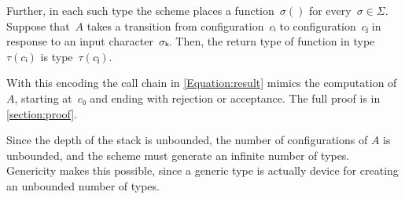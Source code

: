 \documentclass[a4paper,USenglish]{lipics-v2016}
\newcommand\cc[1]{\textcolor{Sepia}{\text{\textup{\textbf{\texttt{#1}}}}}}
\numberwithin{equation}{section}
\numberwithin{figure}{section}
\begin{document}
Further, in each such type the scheme places
  a function~$σ()$ for every~$σ∈Σ$.
Suppose that~$A$ takes a transition from configuration~$cᵢ$ to configuration~$cⱼ$
  in response to an input character~$σₖ$.
Then, the return type of function \cc{$σₖ$()} in type~$τ(cᵢ)$ is type~$τ(cⱼ)$.

With this encoding the call chain in \cref{Equation:result}
  mimics the computation of~$A$, starting at~$c₀$ and ending with
  rejection or acceptance.
The full proof is in \cref{section:proof}.

Since the depth of the stack is unbounded, the number of configurations of $A$ is unbounded,
  and the scheme must generate an infinite number of types.
Genericity makes this possible, since a generic type is
  actually device for creating an unbounded number of types.
\end{document}
